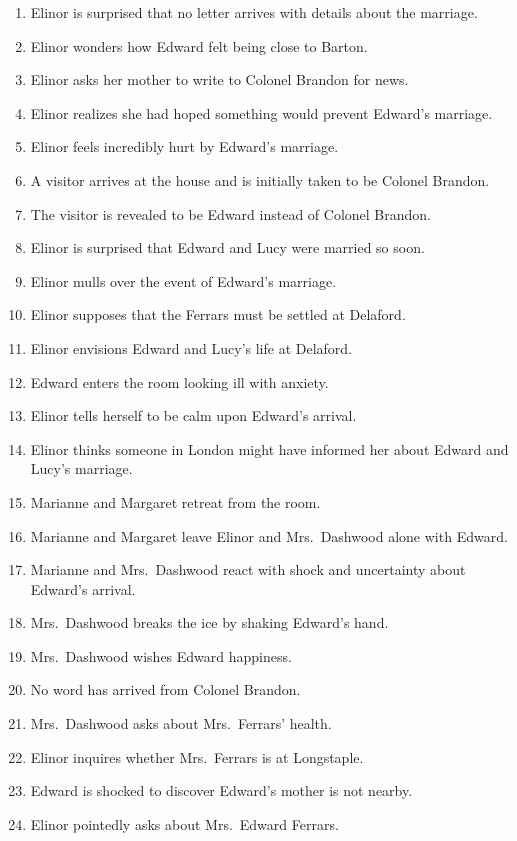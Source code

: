 \documentclass[11pt]{article}
\begin{document}
\begin{enumerate}[label=\textbf{F\arabic*.},leftmargin=*]
  \item Elinor is surprised that no letter arrives with details about the marriage.
  \item Elinor wonders how Edward felt being close to Barton.
  \item Elinor asks her mother to write to Colonel Brandon for news.
  \item Elinor realizes she had hoped something would prevent Edward's marriage.
  \item Elinor feels incredibly hurt by Edward's marriage.
  \item A visitor arrives at the house and is initially taken to be Colonel Brandon.
  \item The visitor is revealed to be Edward instead of Colonel Brandon.
  \item Elinor is surprised that Edward and Lucy were married so soon.
  \item Elinor mulls over the event of Edward's marriage.
  \item Elinor supposes that the Ferrars must be settled at Delaford.
  \item Elinor envisions Edward and Lucy's life at Delaford.
  \item Edward enters the room looking ill with anxiety.
  \item Elinor tells herself to be calm upon Edward's arrival.
  \item Elinor thinks someone in London might have informed her about Edward and Lucy's marriage.
  \item Marianne and Margaret retreat from the room.
  \item Marianne and Margaret leave Elinor and Mrs.~Dashwood alone with Edward.
  \item Marianne and Mrs.~Dashwood react with shock and uncertainty about Edward's arrival.
  \item Mrs.~Dashwood breaks the ice by shaking Edward's hand.
  \item Mrs.~Dashwood wishes Edward happiness.
  \item No word has arrived from Colonel Brandon.
  \item Mrs.~Dashwood asks about Mrs.~Ferrars' health.
  \item Elinor inquires whether Mrs.~Ferrars is at Longstaple.
  \item Edward is shocked to discover Edward's mother is not nearby.
  \item Elinor pointedly asks about Mrs.~Edward Ferrars.

\end{enumerate}
\end{document}
